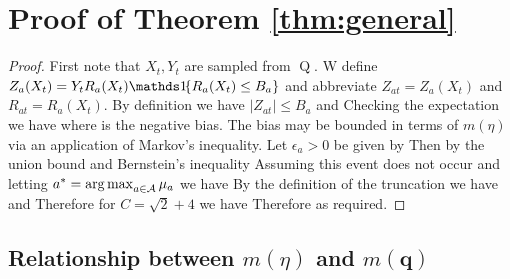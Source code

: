 \section{Proof of Theorem \ref{thm:general}}\label{sec:thm:general}

\begin{proof}
First note that $X_t, Y_t$ are sampled from $\operatorname{Q}$.
W define $Z_a(X_t) = Y_t R_a(X_t)\ind{R_a(X_t)\leq B_a}$ and abbreviate $Z_{at} = Z_a(X_t)$ and $R_{at} = R_a(X_t)$.
By definition we have $|Z_{at}| \leq B_a$ and 
Checking the expectation we have
where 
is the negative bias. 
The bias may be bounded in terms of $m(\eta)$ via an application of Markov's inequality.
Let $\epsilon_a > 0$ be given by
Then by the union bound and Bernstein's inequality 
Assuming this event does not occur and letting $a^* = \argmax_{a \in \calA} \mu_a$ we have
By the definition of the truncation
we have
and
Therefore for $C = \sqrt{2} + 4$ we have
Therefore
as required.
\end{proof}

\subsection{Relationship between $m(\eta)$ and $m(\boldsymbol{q})$}

